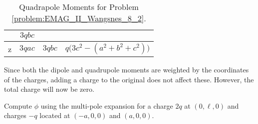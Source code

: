 \documentclass[crop=false,class=book,oneside]{standalone}
\begin{document}
\begin{solution}
\begin{table}[H]
\begin{tabular}{|c|c|c|c|}
                        &$3qbc$\\
                        \hline
                        z&$3qac$&$3qbc$
                        &$q\big(3c^{2}-(a^{2}+b^{2}+c^{2})\big)$\\
                        \hline
                    \end{tabular}
                    \caption{Quadrapole Moments for Problem
                             \ref{problem:EMAG_II_Wangsnes_8_2}.}
                    \label{tab:EMAG_2_Problem_8_2_Wangsness_Quadrupole}
                \end{table}
                Since both the dipole and quadrupole moments are weighted
                by the coordinates of the charges, adding a charge to the
                original does not affect these. However, the total charge will
                now be zero.
            \end{solution}
            \begin{problem}
                \label{problem:EMAG_II_Wangsnes_8_4}
                Compute $\phi$ using the multi-pole expansion for a
                charge $2q$ at $(0,\ell,0)$ and charges $-q$ located at
                $(-a,0,0)$ and $(a,0,0)$.
            \end{problem}
\end{document}
